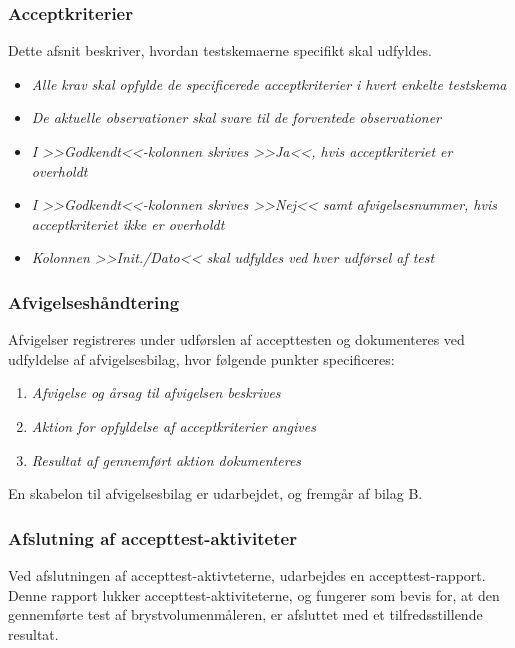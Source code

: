 			\subsubsection{Acceptkriterier}
			 Dette afsnit beskriver, hvordan testskemaerne specifikt skal udfyldes. 
			 
			 \begin{itemize}
				\item \textit{Alle krav skal opfylde de specificerede acceptkriterier i hvert enkelte testskema}
				\item \textit{De aktuelle observationer skal svare til de forventede observationer}
				\item \textit{I >>Godkendt<<-kolonnen skrives >>Ja<<, hvis acceptkriteriet er overholdt} 
				\item \textit{I >>Godkendt<<-kolonnen skrives >>Nej<< samt afvigelsesnummer, hvis acceptkriteriet ikke er overholdt}  \item \textit{Kolonnen >>Init./Dato<< skal udfyldes ved hver udførsel af test}
			\end{itemize}
			
			\subsubsection{Afvigelseshåndtering}	
			Afvigelser registreres under udførslen af accepttesten og dokumenteres ved udfyldelse af afvigelsesbilag, hvor følgende punkter specificeres: 
			
			\begin{enumerate}[label=\alph*)]
				\item \textit{Afvigelse og årsag til afvigelsen beskrives}
				\item \textit{Aktion for opfyldelse af acceptkriterier angives}
				\item \textit{Resultat af gennemført aktion dokumenteres}	
			\end{enumerate}
			
			En skabelon til afvigelsesbilag er udarbejdet, og fremgår af bilag B. 
			
			\subsubsection{Afslutning af accepttest-aktiviteter}
			Ved afslutningen af accepttest-aktivteterne, udarbejdes en accepttest-rapport. Denne rapport lukker accepttest-aktiviteterne, og fungerer som bevis for, at den gennemførte test af brystvolumenmåleren, er afsluttet med et tilfredsstillende resultat. 
			

